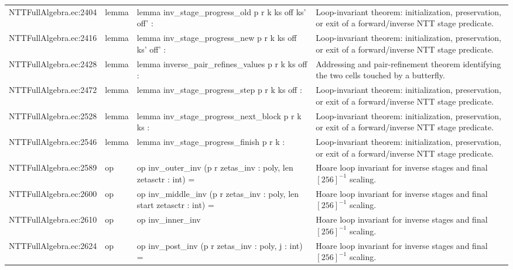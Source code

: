 \documentclass[10pt]{article}
\begin{document}
\begin{longtable}{L{0.11\textwidth}L{0.05\textwidth}L{0.38\textwidth}L{0.42\textwidth}}
NTTFullAlgebra.\allowbreak{}ec:\allowbreak{}2404 & lemma & {\ttfamily\scriptsize lemma inv\_stage\_progress\_old p r k ks off ks' off' :} & Loop-invariant theorem: initialization, preservation, or exit of a forward/inverse NTT stage predicate. \\
NTTFullAlgebra.\allowbreak{}ec:\allowbreak{}2416 & lemma & {\ttfamily\scriptsize lemma inv\_stage\_progress\_new p r k ks off ks' off' :} & Loop-invariant theorem: initialization, preservation, or exit of a forward/inverse NTT stage predicate. \\
NTTFullAlgebra.\allowbreak{}ec:\allowbreak{}2428 & lemma & {\ttfamily\scriptsize lemma inverse\_pair\_refines\_values p r k ks off :} & Addressing and pair-refinement theorem identifying the two cells touched by a butterfly. \\
NTTFullAlgebra.\allowbreak{}ec:\allowbreak{}2472 & lemma & {\ttfamily\scriptsize lemma inv\_stage\_progress\_step p r k ks off :} & Loop-invariant theorem: initialization, preservation, or exit of a forward/inverse NTT stage predicate. \\
NTTFullAlgebra.\allowbreak{}ec:\allowbreak{}2528 & lemma & {\ttfamily\scriptsize lemma inv\_stage\_progress\_next\_block p r k ks :} & Loop-invariant theorem: initialization, preservation, or exit of a forward/inverse NTT stage predicate. \\
NTTFullAlgebra.\allowbreak{}ec:\allowbreak{}2546 & lemma & {\ttfamily\scriptsize lemma inv\_stage\_progress\_finish p r k :} & Loop-invariant theorem: initialization, preservation, or exit of a forward/inverse NTT stage predicate. \\
NTTFullAlgebra.\allowbreak{}ec:\allowbreak{}2589 & op & {\ttfamily\scriptsize op inv\_outer\_inv (p r zetas\_inv : poly, len zetasctr : int) =} & Hoare loop invariant for inverse stages and final $[256]^{-1}$ scaling. \\
NTTFullAlgebra.\allowbreak{}ec:\allowbreak{}2600 & op & {\ttfamily\scriptsize op inv\_middle\_inv (p r zetas\_inv : poly, len start zetasctr : int) =} & Hoare loop invariant for inverse stages and final $[256]^{-1}$ scaling. \\
NTTFullAlgebra.\allowbreak{}ec:\allowbreak{}2610 & op & {\ttfamily\scriptsize op inv\_inner\_inv} & Hoare loop invariant for inverse stages and final $[256]^{-1}$ scaling. \\
NTTFullAlgebra.\allowbreak{}ec:\allowbreak{}2624 & op & {\ttfamily\scriptsize op inv\_post\_inv (p r zetas\_inv : poly, j : int) =} & Hoare loop invariant for inverse stages and final $[256]^{-1}$ scaling. \\

\end{longtable}
\end{document}
